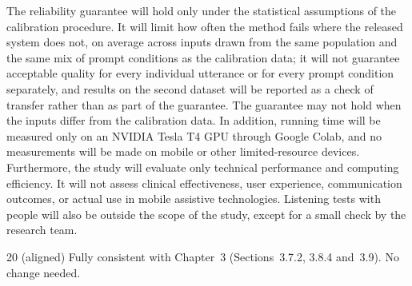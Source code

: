 \documentclass[11pt,a4paper]{article}
\newcounter{cmt}
\begin{document}
The reliability guarantee will hold only under the statistical assumptions of the calibration procedure. It will limit how often the method fails where the released system does not, on average across inputs drawn from the same population and the same mix of prompt conditions as the calibration data; it will not guarantee acceptable quality for every individual utterance or for every prompt condition separately, and results on the second dataset will be reported as a check of transfer rather than as part of the guarantee. The guarantee may not hold when the inputs differ from the calibration data. In addition, running time will be measured only on an NVIDIA Tesla T4 GPU through Google Colab, and no measurements will be made on mobile or other limited-resource devices. Furthermore, the study will evaluate only technical performance and computing efficiency. It will not assess clinical effectiveness, user experience, communication outcomes, or actual use in mobile assistive technologies. Listening tests with people will also be outside the scope of the study, except for a small check by the research team.

\begin{cmt}{20 (aligned)}
Fully consistent with Chapter~3 (Sections~3.7.2, 3.8.4 and~3.9). No change needed.
\end{cmt}
\end{document}
